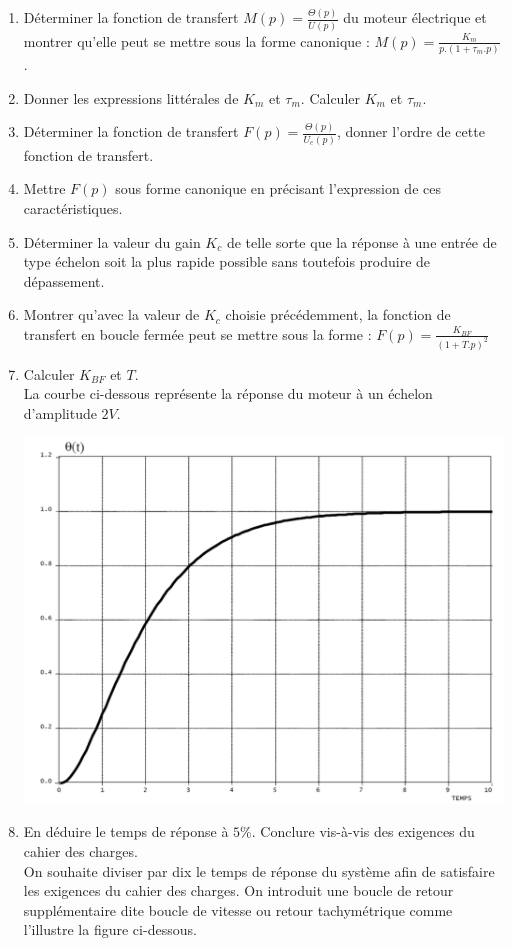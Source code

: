 \begin{enumerate}
\item D\'eterminer la fonction de transfert $M(p) = \frac{\Theta(p)}{U(p)}$ du moteur \'electrique et montrer qu'elle peut se mettre sous la forme canonique : $M(p) = \frac{K_m}{p.(1+\tau_m . p)}$.
\item Donner les expressions litt\'erales de $K_m$ et $\tau_m$. Calculer $K_m$ et $\tau_m$.
\item D\'eterminer la fonction de transfert $F(p)=\frac{\Theta(p)}{U_e(p)}$, donner l'ordre de cette fonction de transfert.
\item Mettre $F(p)$ sous forme canonique en pr\'ecisant l'expression de ces caract\'eristiques.
\item D\'eterminer la valeur du gain $K_c$ de telle sorte que la r\'eponse \`a une entr\'ee de type \'echelon soit la plus rapide possible sans toutefois produire de d\'epassement.
\item Montrer qu'avec la valeur de $K_c$ choisie pr\'ec\'edemment, la fonction de transfert en boucle ferm\'ee peut se mettre sous la forme : $ F(p) = \frac{K_{BF}}{(1+T.p)^2} $
\item Calculer $K_{BF}$ et $T$.\\
La courbe ci-dessous repr\'esente la r\'eponse du moteur \`a un \'echelon d'amplitude $2V$.

\begin{center}
\includegraphics[scale=0.25]{png/image3_prob4.png}
\end{center}

\item En d\'eduire le temps de r\'eponse \`a $5\%$. Conclure vis-\`a-vis des exigences du cahier des charges.\\
On souhaite diviser par dix le temps de r\'eponse du syst\`eme afin de satisfaire les exigences du cahier des charges. On introduit une boucle de retour suppl\'ementaire dite boucle de vitesse ou retour tachym\'etrique comme l'illustre la figure ci-dessous.


\end{enumerate}
